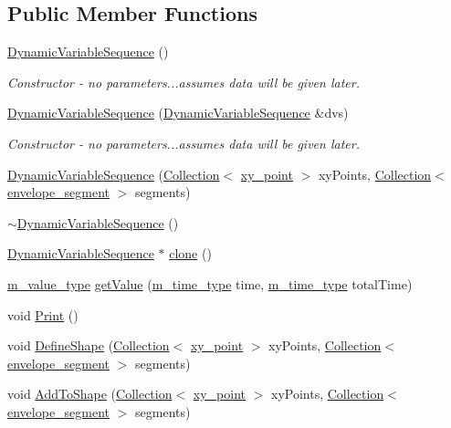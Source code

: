 \subsection*{Public Member Functions}
\begin{CompactItemize}
\item 
\hyperlink{classDynamicVariableSequence_a0}{Dynamic\-Variable\-Sequence} ()
\begin{CompactList}\small\item\em Constructor - no parameters...assumes data will be given later. \item\end{CompactList}\item 
\hyperlink{classDynamicVariableSequence_a1}{Dynamic\-Variable\-Sequence} (\hyperlink{classDynamicVariableSequence}{Dynamic\-Variable\-Sequence} \&dvs)
\begin{CompactList}\small\item\em Constructor - no parameters...assumes data will be given later. \item\end{CompactList}\item 
\hyperlink{classDynamicVariableSequence_a2}{Dynamic\-Variable\-Sequence} (\hyperlink{classCollection}{Collection}$<$ \hyperlink{structxy__point}{xy\_\-point} $>$ xy\-Points, \hyperlink{classCollection}{Collection}$<$ \hyperlink{structenvelope__segment}{envelope\_\-segment} $>$ segments)
\item 
\hyperlink{classDynamicVariableSequence_a3}{$\sim$Dynamic\-Variable\-Sequence} ()
\item 
\hyperlink{classDynamicVariableSequence}{Dynamic\-Variable\-Sequence} $\ast$ \hyperlink{classDynamicVariableSequence_a4}{clone} ()
\item 
\hyperlink{Types_8h_a3}{m\_\-value\_\-type} \hyperlink{classDynamicVariableSequence_a5}{get\-Value} (\hyperlink{Types_8h_a2}{m\_\-time\_\-type} time, \hyperlink{Types_8h_a2}{m\_\-time\_\-type} total\-Time)
\item 
void \hyperlink{classDynamicVariableSequence_a6}{Print} ()
\item 
void \hyperlink{classDynamicVariableSequence_a7}{Define\-Shape} (\hyperlink{classCollection}{Collection}$<$ \hyperlink{structxy__point}{xy\_\-point} $>$ xy\-Points, \hyperlink{classCollection}{Collection}$<$ \hyperlink{structenvelope__segment}{envelope\_\-segment} $>$ segments)
\item 
void \hyperlink{classDynamicVariableSequence_a8}{Add\-To\-Shape} (\hyperlink{classCollection}{Collection}$<$ \hyperlink{structxy__point}{xy\_\-point} $>$ xy\-Points, \hyperlink{classCollection}{Collection}$<$ \hyperlink{structenvelope__segment}{envelope\_\-segment} $>$ segments)

\end{CompactItemize}
